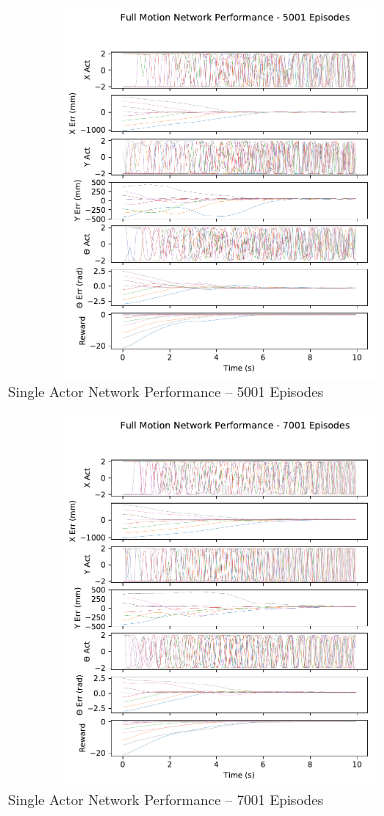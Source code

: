\begin{figure}[H]
	\centering
	\includegraphics[width=6in, height=3.85in, keepaspectratio]{figures/train_figs/all_transitions/3_5001.pdf}
	\caption{Single Actor Network Performance -- 5001 Episodes}
\end{figure}
\begin{figure}[H]
	\centering
	\includegraphics[width=6in, height=3.85in, keepaspectratio]{figures/train_figs/all_transitions/3_7001.pdf}
	\caption{Single Actor Network Performance -- 7001 Episodes}
\end{figure}

